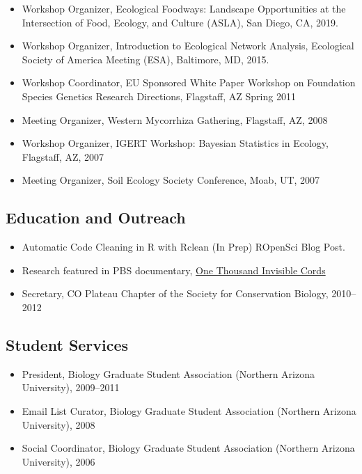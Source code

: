 \documentclass[a4paper]{article}
\begin{document}
\begin{itemize}
\item 
  Workshop Organizer, Ecological Foodways: Landscape Opportunities at
  the Intersection of Food, Ecology, and Culture (ASLA), San Diego,
  CA, 2019.
\item 
  Workshop Organizer, Introduction to Ecological Network Analysis,
  Ecological Society of America Meeting (ESA), Baltimore, MD, 2015.
\item
  Workshop Coordinator, EU Sponsored White Paper Workshop on Foundation
  Species Genetics Research Directions, Flagstaff, AZ Spring 2011
\item
  Meeting Organizer, Western Mycorrhiza Gathering, Flagstaff, AZ, 2008
\item
  Workshop Organizer, IGERT Workshop: Bayesian Statistics in Ecology,
  Flagstaff, AZ, 2007
\item
  Meeting Organizer, Soil Ecology Society Conference, Moab, UT, 2007
\end{itemize}

\subsection{Education and Outreach}\label{education-and-outreach}

\begin{itemize}
\item Automatic Code Cleaning in R with Rclean (In Prep) ROpenSci Blog
  Post.
\item
  Research featured in PBS documentary,
  \href{http://nau.edu/Research/Feature-Stories/A-Thousand-Invisible-Cords/}{One
  Thousand Invisible Cords}
\item
  Secretary, CO Plateau Chapter of the Society for Conservation Biology,
  2010--2012
\end{itemize}

\subsection{Student Services}\label{student-services}

\begin{itemize}
\item
  President, Biology Graduate Student Association (Northern Arizona
  University), 2009--2011
\item
  Email List Curator, Biology Graduate Student Association (Northern
  Arizona University), 2008
\item
  Social Coordinator, Biology Graduate Student Association (Northern
  Arizona University), 2006
\end{itemize}
\end{document}
